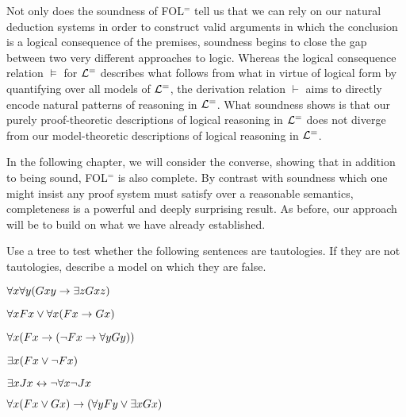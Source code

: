 Not only does the soundness of FOL$^=$ tell us that we can rely on our natural deduction systems in order to construct valid arguments in which the conclusion is a logical consequence of the premises, soundness begins to close the gap between two very different approaches to logic.
Whereas the logical consequence relation $\vDash$ for $\mathcal{L}^{=}$ describes what follows from what in virtue of logical form by quantifying over all models of $\mathcal{L}^{=}$, the derivation relation $\vdash$ aims to directly encode natural patterns of reasoning in $\mathcal{L}^{=}$. 
What soundness shows is that our purely proof-theoretic descriptions of logical reasoning in $\mathcal{L}^{=}$ does not diverge from our model-theoretic descriptions of logical reasoning in $\mathcal{L}^{=}$.

In the following chapter, we will consider the converse, showing that in addition to being sound, FOL$^=$ is also complete. 
By contrast with soundness which one might insist any proof system must satisfy over a reasonable semantics, completeness is a powerful and deeply surprising result.
As before, our approach will be to build on what we have already established.



\iffalse

\practiceproblems

\solutions
\problempart
\label{pr.QL.trees.tautology}
Use a tree to test whether the following sentences are tautologies. If they are not tautologies, describe a model on which they are false.
\begin{earg}
\item $\forall x \forall y (Gxy \rightarrow \exists z Gxz)$
\item $\forall x Fx \vee \forall x (Fx \rightarrow Gx)$
\item $\forall x (Fx \rightarrow (\neg Fx \rightarrow \forall y Gy))$
\item $\exists x (Fx \vee \neg Fx)$
\item $\exists x Jx \leftrightarrow \neg \forall x \neg Jx$
\item $\forall x (Fx \vee Gx) \rightarrow (\forall y Fy \vee \exists x Gx)$
\end{earg}

